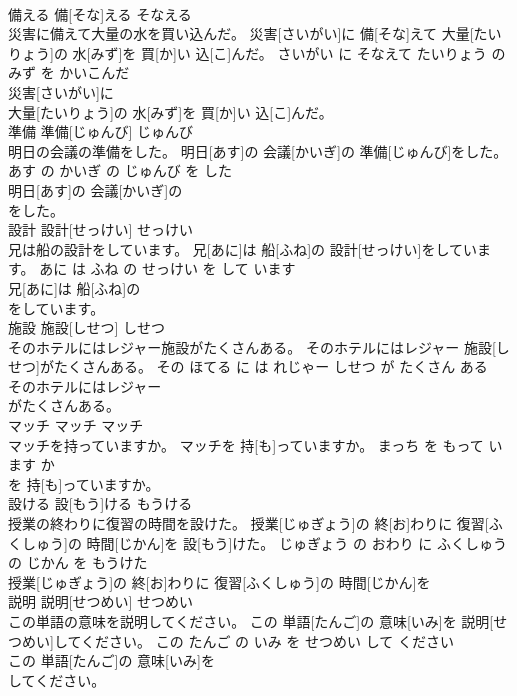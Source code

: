 \documentclass[8pt]{extreport}
\begin{document}
\begin{CJK}{UTF8}{min}
\\	備える	備[そな]える	そなえる	
\\	災害に備えて大量の水を買い込んだ。	災害[さいがい]に 備[そな]えて 大量[たいりょう]の 水[みず]を 買[か]い 込[こ]んだ。	さいがい に そなえて たいりょう の みず を かいこんだ	
\\	災害[さいがい]に
\\	大量[たいりょう]の 水[みず]を 買[か]い 込[こ]んだ。		
\\	準備	準備[じゅんび]	じゅんび	
\\	明日の会議の準備をした。	明日[あす]の 会議[かいぎ]の 準備[じゅんび]をした。	あす の かいぎ の じゅんび を した	
\\	明日[あす]の 会議[かいぎ]の
\\	をした。		
\\	設計	設計[せっけい]	せっけい	
\\	兄は船の設計をしています。	兄[あに]は 船[ふね]の 設計[せっけい]をしています。	あに は ふね の せっけい を して います	
\\	兄[あに]は 船[ふね]の
\\	をしています。		
\\	施設	施設[しせつ]	しせつ	
\\	そのホテルにはレジャー施設がたくさんある。	そのホテルにはレジャー 施設[しせつ]がたくさんある。	その ほてる に は れじゃー しせつ が たくさん ある	
\\	そのホテルにはレジャー
\\	がたくさんある。		
\\	マッチ	マッチ	マッチ	
\\	マッチを持っていますか。	マッチを 持[も]っていますか。	まっち を もって います か	
\\	を 持[も]っていますか。		
\\	設ける	設[もう]ける	もうける	
\\	授業の終わりに復習の時間を設けた。	授業[じゅぎょう]の 終[お]わりに 復習[ふくしゅう]の 時間[じかん]を 設[もう]けた。	じゅぎょう の おわり に ふくしゅう の じかん を もうけた	
\\	授業[じゅぎょう]の 終[お]わりに 復習[ふくしゅう]の 時間[じかん]を
\\	説明	説明[せつめい]	せつめい	
\\	この単語の意味を説明してください。	この 単語[たんご]の 意味[いみ]を 説明[せつめい]してください。	この たんご の いみ を せつめい して ください	
\\	この 単語[たんご]の 意味[いみ]を
\\	してください。		

\end{CJK}
\end{document}
